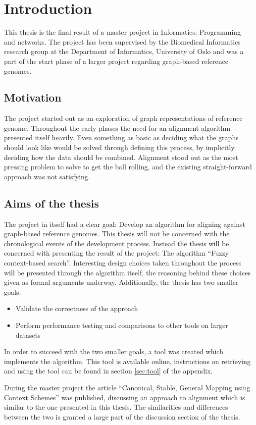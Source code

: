\documentclass[thesis.tex]{subfiles}
\begin{document}
\chapter{Introduction}
This thesis is the final result of a master project in Informatics: Programming and networks. The project has been supervised by the Biomedical Informatics research group at the Department of Informatics, University of Oslo and was a part of the start phase of a larger project regarding graph-based reference genomes.
\section{Motivation}
The project started out as an exploration of graph representations of reference genome. Throughout the early phases the need for an alignment algorithm presented itself heavily. Even something as basic as deciding what the graphs should look like would be solved through defining this process, by implicitly deciding how the data should be combined. Alignment stood out as the most pressing problem to solve to get the ball rolling, and the existing straight-forward approach was not satisfying. 
\section{Aims of the thesis}
The project in itself had a clear goal: Develop an algorithm for aligning against graph-based reference genomes. This thesis will not be concerned with the chronological events of the development process. Instead the thesis will be concerned with presenting the result of the project: The algorithm ``Fuzzy context-based search''. Interesting design choices taken throughout the process will be presented through the algorithm itself, the reasoning behind these choices given as formal arguments underway. Additionally, the thesis has two smaller goals:
\begin{itemize}
  \item Validate the correctness of the approach
  \item Perform performance testing and comparisons to other tools on larger datasets
\end{itemize}
In order to succeed with the two smaller goals, a tool was created which implements the algorithm. This tool is available online, instructions on retrieving and using the tool can be found in section \ref{sec:tool} of the appendix.
\par\noindent
During the master project the article ``Canonical, Stable, General Mapping using Context Schemes'' was published, discussing an approach to alignment which is similar to the one presented in this thesis. The similarities and differences between the two is granted a large part of the discussion section of the thesis.
\end{document}
